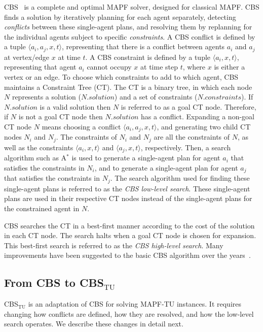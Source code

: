 \documentclass[jair,twoside,11pt,theapa]{article}
\newcommand{\tuple}[1]{\langle#1\rangle}
\newcommand{\astar}{A$^*$\xspace}
\newcommand{\sol}{\mathit{solution}}
\newcommand{\const}{\mathit{constraints}}
\newcommand{\cbstu}{CBS$\mathrm{_{TU}}$\xspace}
\newcommand{\mapftu}{MAPF-TU\xspace}
\begin{document}
CBS~ is a complete and optimal MAPF solver, designed for classical MAPF.
CBS finds a solution by iteratively planning for each agent separately, detecting \emph{conflicts} between these single-agent plans, and resolving them by replanning for the individual agents subject to specific \emph{constraints}. 
A CBS conflict is defined by a tuple $\tuple{a_i, a_j, x, t}$, representing that there is a conflict between agents $a_i$ and $a_j$ at vertex/edge $x$ at time $t$. 
A CBS constraint is defined by a tuple $\tuple{a_i,x,t}$, representing that agent $a_i$ cannot occupy $x$ at time step $t$, where $x$ is either a vertex or an edge. 
To choose which constraints to add to which agent, CBS maintains a Constraint Tree (CT). 
The CT is a binary tree, in which each node $N$ represents a solution ($N.\sol$) and a set of constraints ($N.\const$). 
If $N.\sol$ is a valid solution then $N$ is referred to as a goal CT node.
Therefore, if $N$ is not a goal CT node then $N.\sol$ has a conflict.
Expanding a non-goal CT node $N$ means choosing a conflict $\tuple{a_i,a_j,x,t}$, and generating two child CT nodes $N_i$ and $N_j$. 
The constraints of $N_i$ and $N_j$ are all the constraints of $N$, as well as the constraints $\tuple{a_i,x,t}$ and $\tuple{a_j,x,t}$, respectively. 
Then, a search algorithm such as \astar is used to generate a single-agent plan for agent $a_i$ that satisfies the constraints in $N_i$, and to generate a single-agent plan for agent $a_j$ that satisfies the constraints in $N_j$. 
The search algorithm used for finding these single-agent plans is referred to as the \emph{CBS low-level search}. 
These single-agent plans are used in their respective CT nodes instead of the single-agent plans for the constrained agent in $N$. 


CBS searches the CT in a best-first manner according to the cost of the solution in each CT node.
The search halts when a goal CT node is chosen for expansion. 
This best-first search is referred to as the \emph{CBS high-level search}.
Many improvements have been suggested to the basic CBS algorithm over the years~.


\subsection{From CBS to \cbstu}
\cbstu is an adaptation of CBS for solving \mapftu instances. 
It requires changing how conflicts are defined, how they are resolved, and how the low-level search operates. 
We describe these changes in detail next. 
\end{document}
